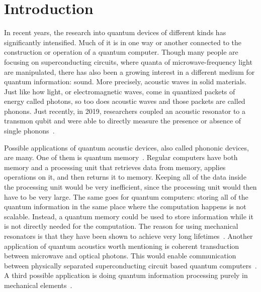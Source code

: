 \chapter{Introduction}

In recent years, the research into quantum devices of different kinds has
significantly intensified.
Much of it is in one way or another connected to the
construction or operation of a quantum computer.
Though many people are focusing on superconducting circuits, where quanta of
microwave-frequency light are manipulated, there has also been
a growing interest in a different medium for quantum information: sound.
More precisely, acoustic waves in solid materials.
Just like how light, or electromagnetic waves, come in quantized packets of energy called
photons,
so too does acoustic waves and those packets are called phonons.
Just recently, in 2019, researchers coupled an acoustic resonator to a transmon
qubit and were able to directly measure the presence or absence of single
phonons~\cite{arrangoiz-arriola_resolving_2019}.

Possible applications of quantum acoustic devices, also called phononic devices, are many.
One of them is quantum memory~\cite{sete_high-efficiency_2015}.
Regular computers have both memory and a processing unit that
retrieves data from memory, applies operations on it, and then returns it to
memory.
Keeping all of the data inside the processing unit would be very inefficient,
since the processing unit would then have to be very large.
The same goes for quantum computers: storing all of the quantum information in
the same place where the computation happens is not scalable.
Instead, a quantum memory could be used to store information while it is not
directly needed for the computation.
The reason for using mechanical resonators is that they have been shown to
achieve very long lifetimes~\cite{maccabe_phononic_2020}.
Another application of quantum acoustics worth mentioning is
coherent transduction between microwave and optical photons.
This would enable communication between physically separated superconducting
circuit based quantum computers~\cite{laer_controlling_2019}.
A third possible application is doing quantum information processing purely in
mechanical elements~\cite{qiao2023developing}.

